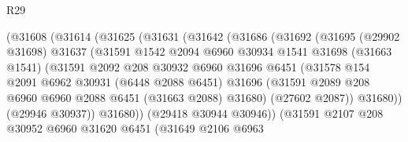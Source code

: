 \begin{lexlean}{R29}
\begin{coremodule}
                      (@31608
                        (@31614
                          (@31625
                            (@31631
                              (@31642
                                (@31686
                                  (@31692
                                    (@31695
                                      (@29902 @31698)
                                      @31637
                                      (@31591
                                        @1542
                                        @2094
                                        @6960
                                        @30934
                                        @1541
                                        @31698
                                        (@31663 @1541)
                                        (@31591
                                          @2092
                                          @208
                                          @30932
                                          @6960
                                          @31696
                                          @6451
                                          (@31578
                                            @154
                                            @2091
                                            @6962
                                            @30931
                                            (@6448 @2088 @6451)
                                            @31696
                                            (@31591
                                              @2089
                                              @208
                                              @6960
                                              @6960
                                              @2088
                                              @6451
                                              (@31663 @2088)
                                              @31680)
                                            (@27602 @2087))
                                          @31680))
                                      (@29946 @30937))
                                    @31680))
                                (@29418 @30944 @30946))
                              (@31591
                                @2107
                                @208
                                @30952
                                @6960
                                @31620
                                @6451
                                (@31649
                                  @2106
                                  @6963

\end{coremodule}
\end{lexlean}
